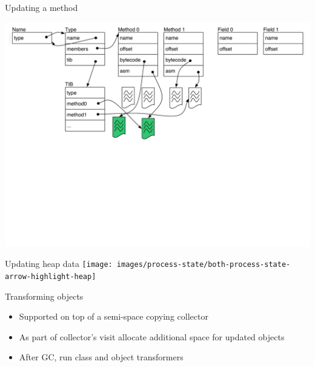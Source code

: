 % 

\begin{frame}{Updating a method}%
\vspace*{-1mm}%
\begin{center}
\includegraphics[scale=0.36]{images/vm-meta-data/vm-meta-data-updated-method}%
\end{center}
\end{frame}


\begin{frame}{Updating heap data}%
\vspace*{-1mm}%
\hspace*{1mm}%
\texttt{[image: images/process-state/both-process-state-arrow-highlight-heap]}%
\end{frame}

\begin{frame}[t,fragile,label=transform]{Transforming objects}%
\begin{itemize}
\item Supported on top of a semi-space copying collector
\item As part of collector's visit allocate additional space for updated
      objects
\item After GC, run class and object transformers
\end{itemize}
\end{frame}

